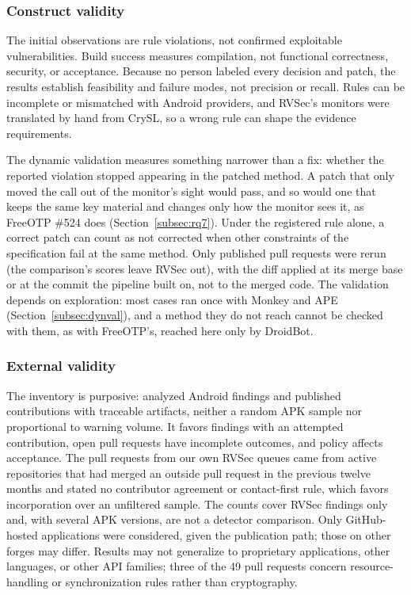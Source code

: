 \documentclass[conference]{IEEEtran}
\begin{document}
\subsubsection{Construct validity}

The initial observations are rule violations, not confirmed exploitable
vulnerabilities. Build success measures compilation, not functional
correctness, security, or acceptance. Because no person labeled every decision
and patch, the results establish feasibility and failure modes, not precision
or recall. Rules can be incomplete or mismatched with Android providers, and
RVSec's monitors were translated by hand from CrySL, so a wrong rule can shape
the evidence requirements.

The dynamic validation measures something narrower than a fix: whether the
reported violation stopped appearing in the patched method. A patch that only
moved the call out of the monitor's sight would pass, and so would one that
keeps the same key material and changes only how the monitor sees it, as
FreeOTP \#524 does (Section~\ref{subsec:rq7}). Under the registered rule alone, a correct patch can count as not corrected
when other constraints of the specification fail at the same method. Only published pull requests were rerun (the comparison's scores leave RVSec
out), with the diff applied at its merge base or at the commit the pipeline
built on, not to the merged code. The validation depends on exploration: most
cases ran once with Monkey and APE (Section~\ref{subsec:dynval}), and a method
they do not reach cannot be checked with them, as with FreeOTP's, reached here
only by DroidBot.

\subsubsection{External validity}

The inventory is purposive: analyzed Android findings and published
contributions with traceable artifacts, neither a random APK sample nor
proportional to warning volume. It favors findings with an attempted
contribution, open pull requests have incomplete outcomes, and policy affects
acceptance. The pull requests from our own RVSec queues came from active
repositories that had merged an outside pull request in the previous twelve
months and stated no contributor agreement or contact-first rule, which favors
incorporation over an unfiltered sample. The counts cover RVSec findings only and, with several APK versions, are not
a detector comparison.
Only GitHub-hosted applications were considered,
given the publication path; those on other forges may differ. Results may not generalize to proprietary applications, other
languages, or other API families; three of the 49 pull requests concern
resource-handling or synchronization rules rather than cryptography.
\end{document}
